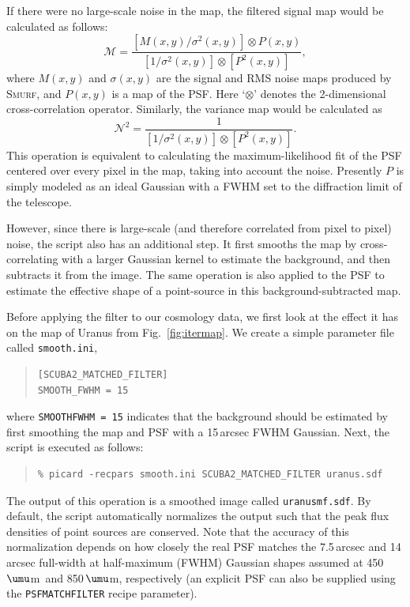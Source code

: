 \documentclass[twoside,11pt]{article}
\newcommand{\micron}{\mbox{\,${\umu}$m}}            %
\newcommand{\xref}[3]{#1}
\renewcommand{\_}{\texttt{\symbol{95}}}
\newenvironment{myquote}{\begin{quote}\begin{small}}{\end{small}\end{quote}}
\newcommand{\smurf}{\xref{\textsc{Smurf}}{sun258}{}}
\newcommand{\param}[1]{\texttt{#1}}
\begin{document}
If there were no large-scale noise in the map, the filtered signal map
would be calculated as follows:
%
\begin{equation}
\mathcal{M} = \frac{[M(x,y)/\sigma^2(x,y)] \otimes P(x,y)}
  {[1/\sigma^2(x,y)] \otimes [P^2(x,y)]},
\end{equation}
%
where $M(x,y)$ and $\sigma(x,y)$ are the signal and RMS
noise maps produced by \smurf, and $P(x,y)$ is a map of the
PSF. Here `$\otimes$' denotes the 2-dimensional cross-correlation
operator. Similarly, the variance map would be calculated as
%
\begin{equation}
  \mathcal{N}^2 = \frac{1}{[1/\sigma^2(x,y)] \otimes [P^2(x,y)]}.
\end{equation}
%
This operation is equivalent to calculating the maximum-likelihood fit
of the PSF centered over every pixel in the map, taking into account
the noise. Presently $P$ is simply modeled as an ideal Gaussian
with a FWHM set to the diffraction limit of the telescope.

However, since there is large-scale (and therefore correlated from
pixel to pixel) noise, the script also has an additional step. It
first smooths the map by cross-correlating with a larger Gaussian
kernel to estimate the background, and then subtracts it from the
image. The same operation is also applied to the PSF to estimate the
effective shape of a point-source in this background-subtracted map.

Before applying the filter to our cosmology data, we first look at the
effect it has on the map of Uranus from Fig.~\ref{fig:itermap}. We
create a simple parameter file called \texttt{smooth.ini},
\begin{myquote}
\begin{verbatim}
[SCUBA2_MATCHED_FILTER]
SMOOTH_FWHM = 15
\end{verbatim}
\end{myquote}
%
where \texttt{SMOOTH\_FWHM = 15} indicates that the background should
be estimated by first smoothing the map and PSF with a 15\,arcsec FWHM
Gaussian. Next, the script is executed as follows:
%
\begin{myquote}
\begin{verbatim}
% picard -recpars smooth.ini SCUBA2_MATCHED_FILTER uranus.sdf
\end{verbatim}
\end{myquote}
%
The output of this operation is a smoothed image called
\texttt{uranus\_mf.sdf}. By default, the script automatically
normalizes the output such that the peak flux densities of point
sources are conserved. Note that the accuracy of this normalization
depends on how closely the real PSF matches the 7.5\,arcsec and
14\,arcsec full-width at half-maximum (FWHM) Gaussian shapes assumed
at 450\micron\ and 850\micron, respectively (an explicit PSF can
also be supplied using the \param{PSF\_MATCHFILTER} recipe
parameter).
\end{document}
